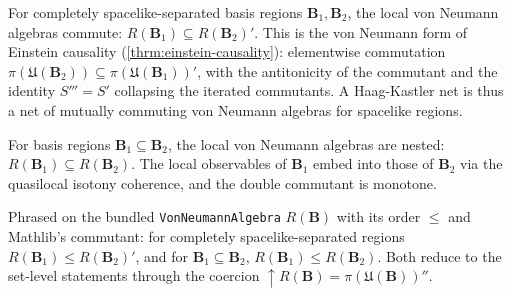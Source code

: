 \begin{theorem}
    \label{thrm:von-neumann-microcausality}
    \leanok
    For completely spacelike-separated basis regions $\mathbf{B}_1, \mathbf{B}_2$, the local von Neumann algebras commute: $R(\mathbf{B}_1) \subseteq R(\mathbf{B}_2)'$. This is the von Neumann form of Einstein causality (\ref{thrm:einstein-causality}): elementwise commutation $\pi(\mathfrak{U}(\mathbf{B}_2)) \subseteq \pi(\mathfrak{U}(\mathbf{B}_1))'$, with the antitonicity of the commutant and the identity $S''' = S'$ collapsing the iterated commutants. A Haag-Kastler net is thus a net of mutually commuting von Neumann algebras for spacelike regions.
\end{theorem}

\begin{theorem}
    \label{thrm:von-neumann-isotony}
    \leanok
    For basis regions $\mathbf{B}_1 \subseteq \mathbf{B}_2$, the local von Neumann algebras are nested: $R(\mathbf{B}_1) \subseteq R(\mathbf{B}_2)$. The local observables of $\mathbf{B}_1$ embed into those of $\mathbf{B}_2$ via the quasilocal isotony coherence, and the double commutant is monotone.
\end{theorem}

\begin{theorem}
    \label{thrm:von-neumann-bundled-order}
    \leanok
    Phrased on the bundled \texttt{VonNeumannAlgebra} $R(\mathbf{B})$ with its order $\le$ and Mathlib's commutant: for completely spacelike-separated regions $R(\mathbf{B}_1) \le R(\mathbf{B}_2)'$, and for $\mathbf{B}_1 \subseteq \mathbf{B}_2$, $R(\mathbf{B}_1) \le R(\mathbf{B}_2)$. Both reduce to the set-level statements through the coercion $\uparrow R(\mathbf{B}) = \pi(\mathfrak{U}(\mathbf{B}))''$.
\end{theorem}

